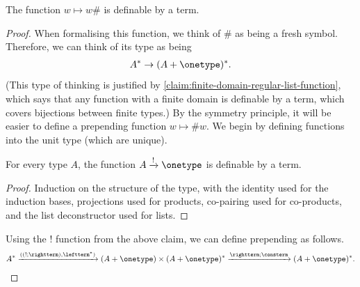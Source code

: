 \begin{lemma}\label{lem:terms-define-append-hash}
    The function $w \mapsto w\#$ is definable by a term.
\end{lemma}
\begin{proof}
    When formalising this function, we think of $\#$ as being a fresh symbol. Therefore, we can think of its type as being 
    \begin{align*}
    A^* \to (A + \onetype)^*.
    \end{align*}
    (This type of thinking is justified by \cref{claim:finite-domain-regular-list-function}, which says that any function with a finite domain is definable by a term, which covers bijections between finite types.) By the symmetry principle, it will be easier to define a prepending function $w \mapsto \#w$. We begin by defining functions into the unit type (which are unique).

    \begin{claim}\label{claim:bang-definable}
         For every type $A$, the function  $A \xrightarrow ! \onetype$ is definable by a term. 
    \end{claim}
    \begin{proof}
        Induction on the structure of the type, with the identity used for the induction bases, projections used for products, co-pairing used for co-products, and the list deconstructor used for lists.
    \end{proof}
    Using the $!$ function from the above claim, we can define prepending as follows.
    \begin{align*}
    A^* \xrightarrow {((!;\rightterm),\leftterm^*)}   (A + \onetype) \times (A + \onetype)^* \xrightarrow {\rightterm;\consterm} (A + \onetype)^*.
    \end{align*}
\end{proof}

